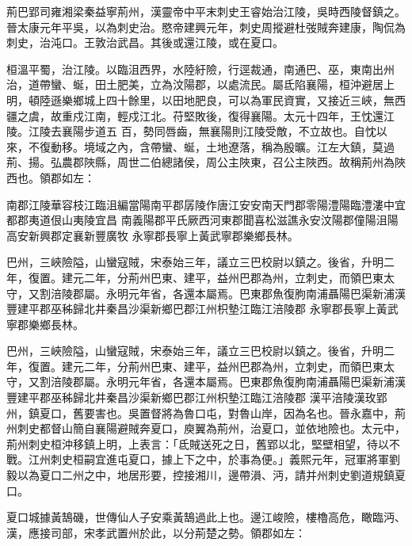 
\begin{pinyinscope}

 荊巴郢司雍湘梁秦益寧荊州，漢靈帝中平末刺史王睿始治江陵，吳時西陵督鎮之。晉太康元年平吳，以為刺史治。愍帝建興元年，刺史周摐避杜弢賊奔建康，陶侃為刺史，治沌口。王敦治武昌。其後或還江陵，或在夏口。



 桓溫平蜀，治江陵。以臨沮西界，水陸紆險，行逕裁通，南通巴、巫，東南出州治，道帶蠻、蜒，田土肥美，立為汶陽郡，以處流民。屬氐陷襄陽，桓沖避居上明，頓陸遜樂鄉城上四十餘里，以田地肥良，可以為軍民資實，又接近三峽，無西疆之虞，故重戍江南，輕戍江北。苻堅敗後，復得襄陽。太元十四年，王忱還江陵。江陵去襄陽步道五
 百，勢同唇齒，無襄陽則江陵受敵，不立故也。自忱以來，不復動移。境域之內，含帶蠻、蜒，土地遼落，稱為殷曠。江左大鎮，莫過荊、揚。弘農郡陜縣，周世二伯總諸侯，周公主陜東，召公主陜西。故稱荊州為陜西也。領郡如左：


南郡江陵華容枝江臨沮編當陽南平郡孱陵作唐江安安南天門郡零陽澧陽臨澧漊中宜都郡夷道佷山夷陵宜昌
 南義陽郡平氏厥西河東郡聞喜松滋譙永安汶陽郡僮陽沮陽高安新興郡定襄新豐廣牧
 永寧郡長寧上黃武寧郡樂鄉長林。



 巴州，三峽險隘，山蠻寇賊，宋泰始三年，議立三巴校尉以鎮之。後省，升明二年，復置。建元二年，分荊州巴東、建平，益州巴郡為州，立刺史，而領巴東太守，又割涪陵郡屬。永明元年省，各還本屬焉。巴東郡魚復朐南浦聶陽巴渠新浦漢豐建平郡巫秭歸北井秦昌沙渠新鄉巴郡江州枳墊江臨江涪陵郡
 永寧郡長寧上黃武寧郡樂鄉長林。



 巴州，三峽險隘，山蠻寇賊，宋泰始三年，議立三巴校尉以鎮之。後省，升明二年，復置。建元二年，分荊州巴東、建平，益州巴郡為州，立刺史，而領巴東太守，又割涪陵郡屬。永明元年省，各還本屬焉。巴東郡魚復朐南浦聶陽巴渠新浦漢豐建平郡巫秭歸北井秦昌沙渠新鄉巴郡江州枳墊江臨江涪陵郡
 漢平涪陵漢玫郢州，鎮夏口，舊要害也。吳置督將為魯口屯，對魯山岸，因為名也。晉永嘉中，荊州刺史都督山簡自襄陽避賊奔夏口，庾翼為荊州，治夏口，並依地險也。太元中，荊州刺史桓沖移鎮上明，上表言：「氐賊送死之日，舊郢以北，堅壁相望，待以不戰。江州刺史桓嗣宜進屯夏口，據上下之中，於事為便。」義熙元年，冠軍將軍劉毅以為夏口二州之中，地居形要，控接湘川，邊帶溳、沔，請并州刺史劉道規鎮夏口。



 夏口城據黃鵠磯，世傳仙人子安乘黃鵠過此上也。邊江峻險，樓櫓高危，瞰臨沔、漢，應接司部，宋孝武置州於此，以分荊楚之勢。領郡如左：




\end{pinyinscope}
